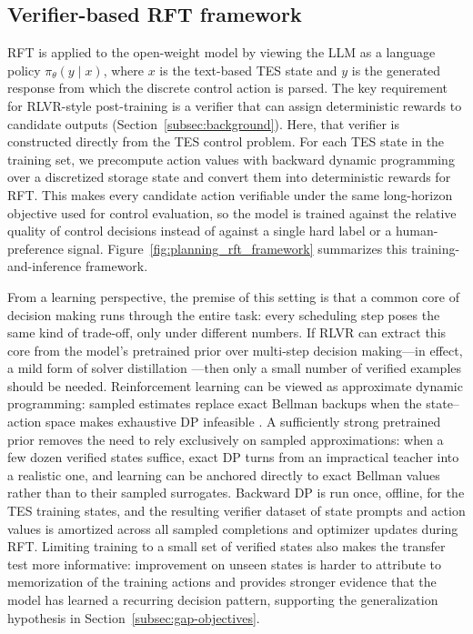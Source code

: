 \documentclass[11pt]{article}
\begin{document}
\subsection{Verifier-based RFT framework}\label{subsec:rft-procedure}
RFT is applied to the open-weight model by viewing the LLM as a language policy $\pi_{\theta}(y \mid x)$, where $x$ is the text-based TES state and $y$ is the generated response from which the discrete control action is parsed. The key requirement for RLVR-style post-training is a verifier that can assign deterministic rewards to candidate outputs (Section~\ref{subsec:background}). Here, that verifier is constructed directly from the TES control problem. For each TES state in the training set, we precompute action values with backward dynamic programming over a discretized storage state and convert them into deterministic rewards for RFT. This makes every candidate action verifiable under the same long-horizon objective used for control evaluation, so the model is trained against the relative quality of control decisions instead of against a single hard label or a human-preference signal. Figure~\ref{fig:planning_rft_framework} summarizes this training-and-inference framework.

From a learning perspective, the premise of this setting is that a common core of decision making runs through the entire task: every scheduling step poses the same kind of trade-off, only under different numbers. If RLVR can extract this core from the model's pretrained prior over multi-step decision making---in effect, a mild form of solver distillation \cite{hinton2015_distillation,anthony2017_expert_iteration}---then only a small number of verified examples should be needed. Reinforcement learning can be viewed as approximate dynamic programming: sampled estimates replace exact Bellman backups when the state--action space makes exhaustive DP infeasible \cite{bertsekas_tsitsiklis_ndp_1996,sutton_barto_rl_2018}. A sufficiently strong pretrained prior removes the need to rely exclusively on sampled approximations: when a few dozen verified states suffice, exact DP turns from an impractical teacher into a realistic one, and learning can be anchored directly to exact Bellman values rather than to their sampled surrogates. Backward DP is run once, offline, for the TES training states, and the resulting verifier dataset of state prompts and action values is amortized across all sampled completions and optimizer updates during RFT. Limiting training to a small set of verified states also makes the transfer test more informative: improvement on unseen states is harder to attribute to memorization of the training actions and provides stronger evidence that the model has learned a recurring decision pattern, supporting the generalization hypothesis in Section~\ref{subsec:gap-objectives}.
\end{document}
